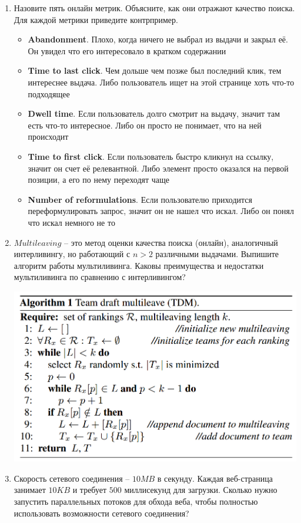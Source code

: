 \begin{enumerate}
	\item Назовите пять онлайн метрик. Объясните, как они отражают качество поиска. Для 
	каждой метрики приведите контрпример.
	\begin{itemize}
		\item \textbf{Abandonment}. Плохо, когда ничего не выбрал из выдачи и закрыл её. Он 
		увидел что его интересовало в кратком содержании
		\item \textbf{Time to last click}. Чем дольше чем позже был последний клик, тем 
		интереснее выдача. Либо пользователь ищет на этой странице хоть что-то подходящее 
		\item \textbf{Dwell time}. Если пользователь долго смотрит на выдачу, значит там 
		есть что-то интересное. Либо он просто не понимает, что на ней происходит
		\item \textbf{Time to first click}. Если пользователь быстро кликнул на ссылку, 
		значит он счет её релевантной. Либо элемент просто оказался на первой позиции, а его 
		по нему переходят чаще
		\item \textbf{Number of reformulations}. Если пользователю приходится 
		переформулировать запрос, значит он не нашел что искал. Либо он понял что искал 
		немного не то
	\end{itemize}
	
	\item $Multileaving$ – это метод оценки качества поиска (онлайн), аналогичный 
	интерливингу, но работающий с $n > 2$ различными выдачами. Выпишите алгоритм работы 
	мультиливинга. Каковы преимущества и недостатки мультиливинга по сравнению с 
	интерливингом?
	
	\includegraphics[scale=0.38]{ha/img/multileaving.PNG}
	
	\item Скорость сетевого соединения – $10MB$ в секунду. Каждая веб-страница занимает 
	$10KB$ и требует $500$ миллисекунд для загрузки. Сколько нужно запустить параллельных 
	потоков для обхода веба, чтобы полностью использовать возможности сетевого соединения?
	

\end{enumerate}

